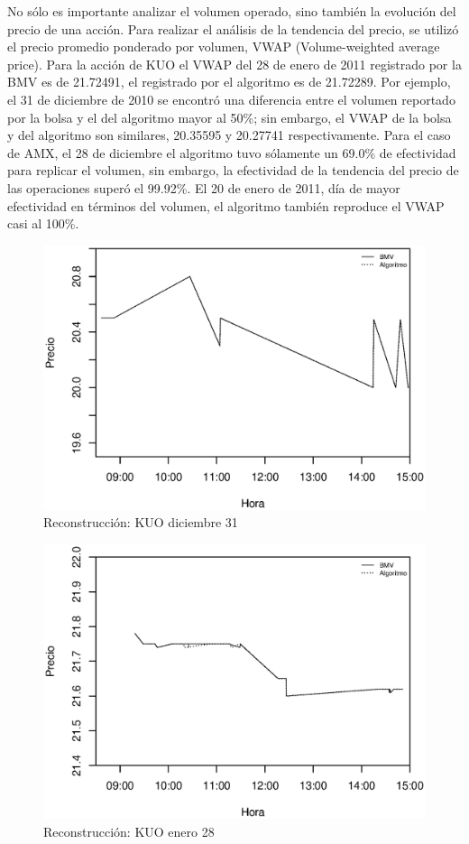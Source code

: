 \documentclass[11pt]{article}
\numberwithin{equation}{section} %
\begin{document}
No sólo es importante analizar el volumen operado, sino también la evolución del precio de una acción. Para realizar el análisis de la tendencia del precio, se utilizó el precio promedio ponderado por volumen, VWAP (Volume-weighted average price). Para la acción de KUO el VWAP del 28 de enero de 2011 registrado por la BMV es de 21.72491, el registrado por el algoritmo es de 21.72289. Por ejemplo, el 31 de diciembre de 2010 se encontró una diferencia entre el volumen reportado por la bolsa y el del algoritmo mayor al 50\%; sin embargo, el VWAP de la bolsa y del algoritmo son similares, 20.35595 y 20.27741 respectivamente. Para el caso de AMX, el 28 de diciembre el algoritmo tuvo sólamente un 69.0\% de efectividad para replicar el volumen, sin embargo, la efectividad de la tendencia del precio de las operaciones superó el 99.92\%. El 20 de enero de 2011, día de mayor efectividad en términos del volumen, el algoritmo también reproduce el VWAP casi al 100\%.

\begin{figure}[htbp] \centering
\includegraphics[scale=0.75, trim=0 0.5cm 0 1.5cm]{kuo123110.eps}
\caption{Reconstrucción: KUO diciembre 31}
\label{kuo1231}
\end{figure}

\begin{figure}[htbp] \centering
\includegraphics[scale=0.75, trim=0 0.5cm 0 1.5cm]{kuo012811.eps}
\caption{Reconstrucción: KUO enero 28}
\label{kuo0128}
\end{figure}
\end{document}
